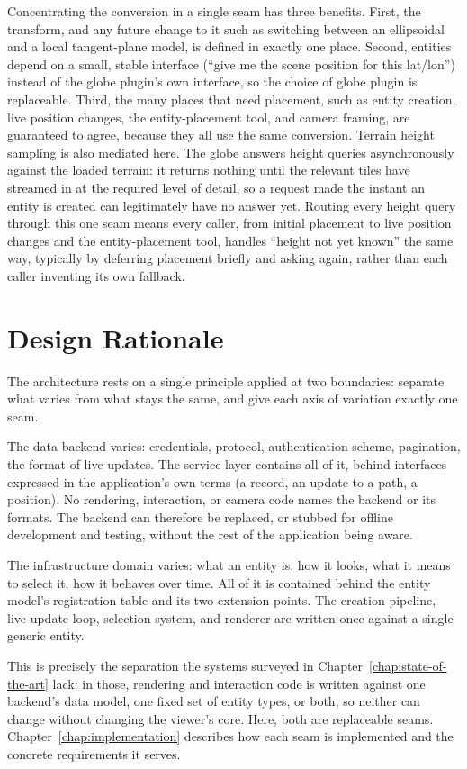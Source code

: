 Concentrating the conversion in a single seam has three benefits. First, the transform, and any future change to it such as switching between an ellipsoidal and a local tangent-plane model, is defined in exactly one place. Second, entities depend on a small, stable interface (``give me the scene position for this lat/lon'') instead of the globe plugin's own interface, so the choice of globe plugin is replaceable. Third, the many places that need placement, such as entity creation, live position changes, the entity-placement tool, and camera framing, are guaranteed to agree, because they all use the same conversion. Terrain height sampling is also mediated here. The globe answers height queries asynchronously against the loaded terrain: it returns nothing until the relevant tiles have streamed in at the required level of detail, so a request made the instant an entity is created can legitimately have no answer yet. Routing every height query through this one seam means every caller, from initial placement to live position changes and the entity-placement tool, handles ``height not yet known'' the same way, typically by deferring placement briefly and asking again, rather than each caller inventing its own fallback.

\section{Design Rationale}
\label{sec:design-rationale}

The architecture rests on a single principle applied at two boundaries: separate what varies from what stays the same, and give each axis of variation exactly one seam.

The data backend varies: credentials, protocol, authentication scheme, pagination, the format of live updates. The service layer contains all of it, behind interfaces expressed in the application's own terms (a record, an update to a path, a position). No rendering, interaction, or camera code names the backend or its formats. The backend can therefore be replaced, or stubbed for offline development and testing, without the rest of the application being aware.

The infrastructure domain varies: what an entity is, how it looks, what it means to select it, how it behaves over time. All of it is contained behind the entity model's registration table and its two extension points. The creation pipeline, live-update loop, selection system, and renderer are written once against a single generic entity.

This is precisely the separation the systems surveyed in Chapter~\ref{chap:state-of-the-art} lack: in those, rendering and interaction code is written against one backend's data model, one fixed set of entity types, or both, so neither can change without changing the viewer's core. Here, both are replaceable seams. Chapter~\ref{chap:implementation} describes how each seam is implemented and the concrete requirements it serves.
